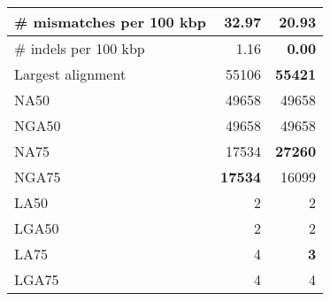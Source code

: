\documentclass[12pt,a4paper]{article}
\begin{document}
\begin{table}[ht]
\begin{center}
\begin{tabular}{|l*{2}{|r}|}
\# mismatches per 100 kbp & 32.97 & {\bf 20.93} \\ \hline
\# indels per 100 kbp & 1.16 & {\bf 0.00} \\ \hline
Largest alignment & 55106 & {\bf 55421} \\ \hline
NA50 & 49658 & 49658 \\ \hline
NGA50 & 49658 & 49658 \\ \hline
NA75 & 17534 & {\bf 27260} \\ \hline
NGA75 & {\bf 17534} & 16099 \\ \hline
LA50 & 2 & 2 \\ \hline
LGA50 & 2 & 2 \\ \hline
LA75 & 4 & {\bf 3} \\ \hline
LGA75 & 4 & 4 \\ \hline
\end{tabular}
\end{center}
\end{table}
\end{document}
